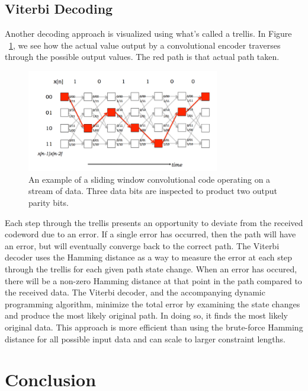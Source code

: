 \documentclass[12pt]{article}
\begin{document}
\subsection{Viterbi Decoding}

Another decoding approach is visualized using what's called a trellis. In Figure ~\ref{fig:trellis}, we see how the actual value output by a convolutional encoder traverses through the possible output values. The red path is that actual path taken.

\begin{figure}[ht!]
 \centering
 \includegraphics[width=0.75\textwidth]{img/trellis.png}
 \caption{An example of a sliding window convolutional code operating on a stream of data. Three data bits are inspected to product two output parity bits. \cite{mitconv} }
 \label{fig:trellis}
 \end{figure}

Each step through the trellis presents an opportunity to deviate from the received codeword due to an error. If a single error has occurred, then the path will have an error, but will eventually converge back to the correct path. The Viterbi decoder uses the Hamming distance as a way to measure the error at each step through the trellis for each given path state change. When an error has occured, there will be a non-zero Hamming distance at that point in the path compared to the received data. The Viterbi decoder, and the accompanying dynamic programming algorithm, minimize the total error by examining the state changes and produce the most likely original path. In doing so, it finds the most likely original data. This approach is more efficient than using the brute-force Hamming distance for all possible input data and can scale to larger constraint lengths. \cite{mitvit}

\section{Conclusion}
\end{document}
